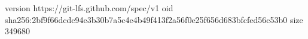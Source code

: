 version https://git-lfs.github.com/spec/v1
oid sha256:2bf9f66dcdc94e3b30b7a5c4e4b49f413f2a56f0e25f656d683bfcfed56c53b0
size 349680
